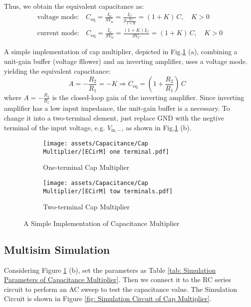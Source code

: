 \documentclass[D:/a_RemoteRepo/GH.LatexNotes/.demo/Analog_Circuits_Handbook.tex]{subfiles}
\begin{document}
Thus, we obtain the equivalent capacitance as:
\begin{align}
   &\text{voltage mode:}\quad  C_{\text{eq}} = \frac{I_\text{n}}{SV_\text{n}} = \frac{I_C}{S\frac{V_C}{1 + K}} = (1 + K)\, C,\quad K > 0 \\ 
    &\text{current mode:}\quad  C_{\text{eq}} = \frac{I_\text{n}}{SV_\text{n}} = \frac{(1 + K) I_C}{S V_C} = (1 + K) \, C,\quad K > 0
\end{align}

A simple implementation of cap multiplier, depicted in Fig.\ref{fig: Capacitance Multiplier} (a), combining a unit-gain buffer (voltage fllower) and an inverting amplifier, uses a voltage mode. yielding the equivalent capacitance:
\begin{equation}
A = - \frac{R_2}{R_1} = - K \Longrightarrow  C_{\text{eq}} = \left(1 + \frac{R_2}{R_1}\right) \,C
\end{equation}
where $A = -\frac{R_2}{R_1}$ is the closed-loop gain of the inverting amplifier. 
Since inverting amplifier has a low input impedance, the unit-gain buffer is a necessary. 
To change it into a two-terminal element, just replace GND with the negtive terminal of the input voltage, e.g. $V_{\text{in}, -}$, as shown in Fig.\ref{fig: Capacitance Multiplier} (b).

\begin{figure}[H]\centering
\begin{subfigure}[b]{0.5\columnwidth}\centering
    \texttt{[image: assets/Capacitance/Cap Multiplier/[ECirM] one terminal.pdf]}
    \caption{One-terminal Cap Multiplier}
\end{subfigure}\hfill
\begin{subfigure}[b]{0.5\columnwidth}\centering
    \texttt{[image: assets/Capacitance/Cap Multiplier/[ECirM] tow terminals.pdf]}
    \caption{Two-terminal Cap Multiplier}
\end{subfigure}
\caption{A Simple Implementation of Capacitance Multiplier}
\label{fig: Capacitance Multiplier}
\end{figure}


\subsection{Multisim Simulation}
Considering Figure \ref{fig: Capacitance Multiplier} (b), set the parameters as Table \ref{tab: Simulation Parameters of Capacitance Multiplier}. 
Then we connect it to the RC series circuit to perform an AC sweep to test the capacitance value. The Simulation Circuit is shown in Figure \ref{fig: Simulation Circuit of Cap Multiplier}.
\end{document}
